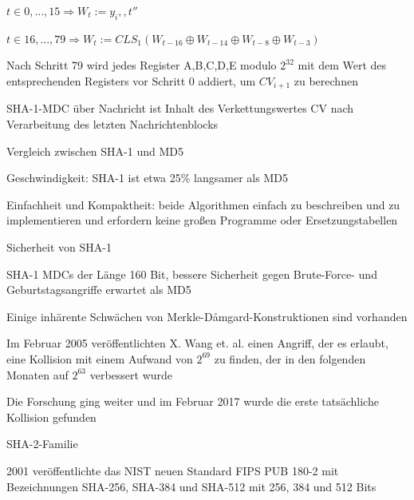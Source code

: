 \documentclass[a4paper]{article}
\begin{document}
\begin{multicols}{3}
\begin{itemize*}
            \begin{itemize*}
                  \item $t\in{0,...,15}\Rightarrow W_t:= y_i,,t''$
                  \item $t\in{16,...,79}\Rightarrow W_t:=CLS_1(W_{t-16}\oplus W_{t-14}\oplus W_{t-8} \oplus W_{t-3})$
                  \item Nach Schritt 79 wird jedes Register A,B,C,D,E modulo $2^{32}$ mit dem Wert des entsprechenden Registers vor Schritt 0 addiert, um $CV_{i+1}$ zu berechnen
            \end{itemize*}
            \item SHA-1-MDC über Nachricht ist Inhalt des Verkettungswertes CV nach Verarbeitung des letzten Nachrichtenblocks
            \item Vergleich zwischen SHA-1 und MD5
            \begin{itemize*}
                  \item Geschwindigkeit: SHA-1 ist etwa 25\% langsamer als MD5 %
                  \item Einfachheit und Kompaktheit: beide Algorithmen einfach zu beschreiben und zu implementieren und erfordern keine großen Programme oder Ersetzungstabellen
            \end{itemize*}
            \item Sicherheit von SHA-1
            \begin{itemize*}
                  \item SHA-1 MDCs der Länge 160 Bit, bessere Sicherheit gegen Brute-Force- und Geburtstagsangriffe erwartet als MD5
                  \item Einige inhärente Schwächen von Merkle-Dåmgard-Konstruktionen sind vorhanden
                  \item Im Februar 2005 veröffentlichten X. Wang et. al. einen Angriff, der es erlaubt, eine Kollision mit einem Aufwand von $2^{69}$ zu finden, der in den folgenden Monaten auf $2^{63}$ verbessert wurde
                  \item Die Forschung ging weiter und im Februar 2017 wurde die erste tatsächliche Kollision gefunden %
            \end{itemize*}
            \item SHA-2-Familie
            \begin{itemize*}
                  \item 2001 veröffentlichte das NIST neuen Standard FIPS PUB 180-2 mit Bezeichnungen SHA-256, SHA-384 und SHA-512 mit 256, 384 und 512 Bits

\end{itemize*}
\end{itemize*}
\end{multicols}
\end{document}
